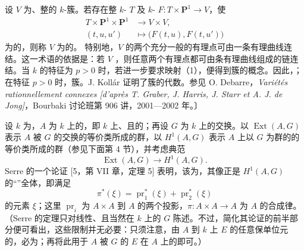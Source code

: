 设 $V$ 为、整的 $k$-簇。若存在整 $k$- $T$ 及 $k$- $F:T\times\mathbf P^1\to V$，使
\[
\begin{aligned}
T\times\mathbf P^1\times\mathbf P^1&\longrightarrow V\times V,\\
(t,u,u')&\longmapsto\bigl(F(t,u),F(t,u')\bigr)
\end{aligned}\tag{1}
\]
为的，则称 $V$ 为的。
特别地，$V$ 的两个充分一般的有理点可由一条有理曲线连结。这一术语的依据是：若 $V$ ，则任意两个有理点都可由条有理曲线组成的链连结。当 $k$ 的特征为 $p>0$ 时，若进一步要求映射（1），便得到簇的概念。因此，；在特征 $p>0$ 时，簇。J. Kollár 证明了簇的代数。参见 O. Debarre，\textit{Variétés rationnellement connexes [d'après T. Graber, J. Harris, J. Starr et A. J. de Jong]}，Bourbaki 讨论班第 906 讲，2001—2002 年。〕

设 $k$ 为，$A$ 为 $k$ 上的，即 $k$ 上、且的；再设 $G$ 为 $k$ 上的交换。以 $\operatorname{Ext}(A,G)$ 表示 $A$ 被 $G$ 的交换的等价类所成的群，以 $H^1(A,G)$ 表示 $A$ 上以 $G$ 为群的的等价类所成的群（参见下面第 4 节），并考虑典范
\[
\operatorname{Ext}(A,G)\longrightarrow H^1(A,G).
\]
Serre 的一个论证 [5，第 VII 章，定理 5] 表明，该为，其像正是 $H^1(A,G)$ 的“”全体，即满足
\[
\pi^*(\xi)=\operatorname{pr}_1^*(\xi)+\operatorname{pr}_2^*(\xi)
\]
的元素 $\xi$；这里 $\operatorname{pr}_i$ 为 $A\times A$ 到 $A$ 的两个投影，$\pi:A\times A\to A$ 为 $A$ 的合成律。（Serre 的定理只对线性、且当然在 $k$ 上的 $G$ 陈述。不过，简化其论证的前半部分便可看出，这些限制并无必要：只须注意，由 $A$ 到 $k$ 上 $E$ 的任意保单位元的，必为；再将此用于 $A$ 被 $G$ 的 $E$ 在 $A$ 上的即可。）

